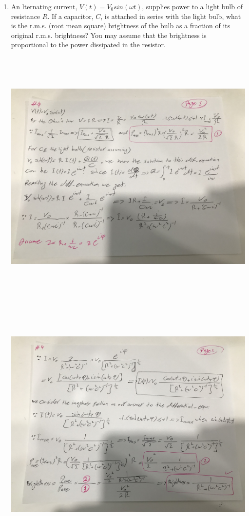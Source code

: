 \documentclass[fleqn]{article}
\begin{document}
\begin{enumerate}
    \pagebreak

    \item An lternating current, $V(t)=V_0 sin(\omega t)$, supplies power to a light bulb of resistance $R$. 
    If a capacitor, $C$, is attached in series with the light bulb, what is the r.m.s. (root mean square) 
    brightness of the bulb as a fraction of its original r.m.s. brightness? You may assume that
    the brightness is proportional to the power dissipated in the resistor.

    \includegraphics[height=13cm, width=15cm]{4A.jpg}

    \pagebreak

    \includegraphics[height=13cm, width=15cm]{4B.jpg}


\end{enumerate}
\end{document}
